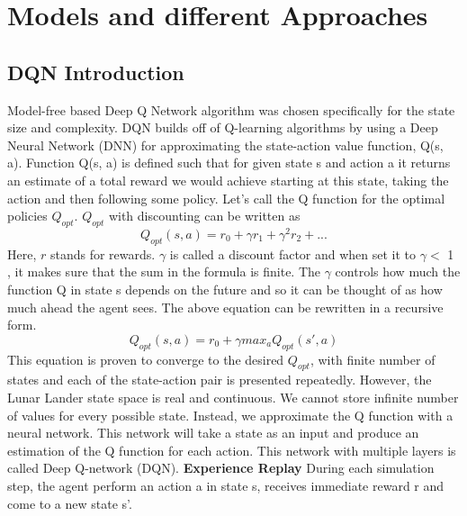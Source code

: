 \section{Models and different Approaches}

\subsection{DQN Introduction}

Model-free based Deep Q Network algorithm was chosen specifically for the state size and complexity. DQN builds off of Q-learning algorithms by using a Deep Neural Network (DNN) for approximating the state-action value function, Q(s, a). Function Q(s, a) is defined such that for given state s and action a it returns an estimate of a total reward we would achieve starting at this state, taking the action and then following some policy. Let’s call the Q function for the optimal policies $Q_{opt}$.
 $Q_{opt}$ with discounting can be written as 
 \begin{equation}
Q_{opt}(s,a) = r_{0} + \gamma r_{1} + \gamma^{2} r_{2} + ...
\end{equation}
Here, $r$ stands for rewards. $\gamma$ is called a discount factor and when set it to $\gamma < $  1 , it makes sure that the sum in the formula is finite. The $\gamma$ controls how much the function Q in state s depends on the future and so it can be thought of as how much ahead the agent sees.  \newline
The above equation can be rewritten in a recursive form.
 \begin{equation}
Q_{opt}(s,a) = r_{0} + \gamma max_{a}Q_{opt}(s',a)
\end{equation}
This equation is proven to converge to the desired $Q_{opt}$, with finite number of states and each of the state-action pair is presented repeatedly. However, the Lunar Lander state space is real and continuous. We cannot store infinite number of values for every possible state. Instead, we  approximate the Q function with a neural network. This network will take a state as an input and produce an estimation of the Q function for each action. This network with multiple layers is called Deep Q-network (DQN).
\newline \newline
\textbf{Experience Replay} \newline \newline
During each simulation step, the agent perform an action a in state s, receives immediate reward r and come to a new state s’.
